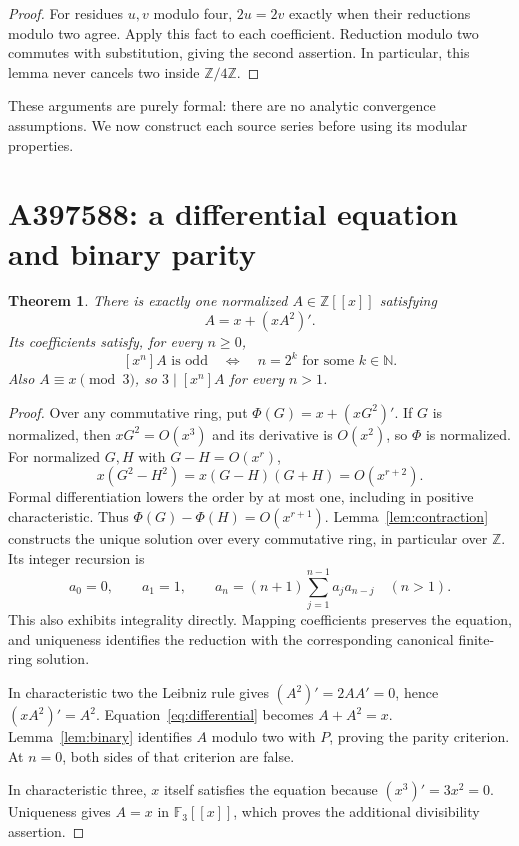 \documentclass[11pt,a4paper]{article}
\newtheorem{theorem}{Theorem}[section]
\theoremstyle{remark}
\newcommand{\Z}{\mathbb Z}
\newcommand{\N}{\mathbb N}
\newcommand{\F}{\mathbb F}
\newcommand{\ps}[1]{#1[[x]]}
\begin{document}
\begin{proof}
For residues $u,v$ modulo four, $2u=2v$ exactly when their reductions modulo
two agree. Apply this fact to each coefficient. Reduction modulo two
commutes with substitution, giving the second assertion. In particular,
this lemma never cancels two inside $\Z/4\Z$.
\end{proof}

These arguments are purely formal: there are no analytic convergence
assumptions. We now construct each source series before using its modular
properties.

\section{A397588: a differential equation and binary parity}

\begin{theorem}\label{thm:differential}
There is exactly one normalized $A\in\ps{\Z}$ satisfying
\begin{equation}\label{eq:differential}
 A=x+(xA^2)'.
\end{equation}
Its coefficients satisfy, for every $n\ge0$,
\[
 [x^n]A\text{ is odd}\quad\Longleftrightarrow\quad
 n=2^k\text{ for some }k\in\N.
\]
Also $A\equiv x\pmod3$, so $3\mid[x^n]A$ for every $n>1$.
\end{theorem}

\begin{proof}
Over any commutative ring, put $\Phi(G)=x+(xG^2)'$. If $G$ is normalized,
then $xG^2=O(x^3)$ and its derivative is $O(x^2)$, so $\Phi$ is normalized.
For normalized $G,H$ with $G-H=O(x^r)$,
\[
 x(G^2-H^2)=x(G-H)(G+H)=O(x^{r+2}).
\]
Formal differentiation lowers the order by at most one, including in
positive characteristic. Thus $\Phi(G)-\Phi(H)=O(x^{r+1})$.
Lemma~\ref{lem:contraction} constructs the unique solution over every
commutative ring, in particular over $\Z$. Its integer recursion is
\[
 a_0=0,\qquad a_1=1,\qquad
 a_n=(n+1)\sum_{j=1}^{n-1}a_ja_{n-j}\quad(n>1).
\]
This also exhibits integrality directly. Mapping coefficients preserves
the equation, and uniqueness identifies the reduction with the
corresponding canonical finite-ring solution.

In characteristic two the Leibniz rule gives $(A^2)'=2AA'=0$, hence
$(xA^2)'=A^2$. Equation~\eqref{eq:differential} becomes $A+A^2=x$.
Lemma~\ref{lem:binary} identifies $A$ modulo two with $P$, proving the
parity criterion. At $n=0$, both sides of that criterion are false.

In characteristic three, $x$ itself satisfies the equation because
$(x^3)'=3x^2=0$. Uniqueness gives $A=x$ in $\ps{\F_3}$, which proves the
additional divisibility assertion.
\end{proof}
\end{document}
